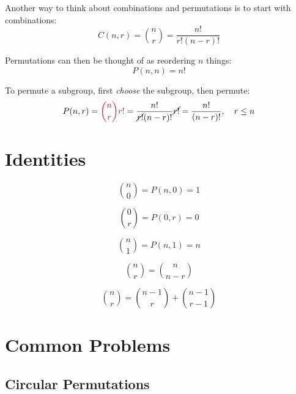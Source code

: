 \documentclass{article}
\begin{document}
    Another way to think about combinations and permutations is to start with combinations: \begin{equation}
        C(n, r) = {n \choose r} = \frac{n!}{r!(n - r)!}
    \end{equation}

    Permutations can then be thought of as reordering $n$ things: \begin{equation}
        P(n, n) = n!
    \end{equation}
        
    To permute a subgroup, first \textit{choose} the subgroup, then permute: \begin{equation}
        P(n, r) = \color{purple}{n \choose r}r!\color{black} = \frac{n!}{\cancel{r!}(n - r)!}\cancel{r!} = \frac{n!}{(n - r)!}, \quad r \leq n
    \end{equation}

    \section{Identities}
    
    \begin{equation}
        {n \choose 0} = P(n, 0) = 1
    \end{equation}

    \begin{equation}
        {0 \choose r} = P(0, r) = 0
    \end{equation}
    
    \begin{equation}
        {n \choose 1} = P(n, 1) = n
    \end{equation}
    
    \begin{equation}
        {n \choose r} = {n \choose n - r}
    \end{equation}

    \begin{equation}
        {n \choose r} = {n - 1 \choose r} + {n - 1 \choose r - 1}
    \end{equation}

    \section{Common Problems}

    \subsection{Circular Permutations}
\end{document}
